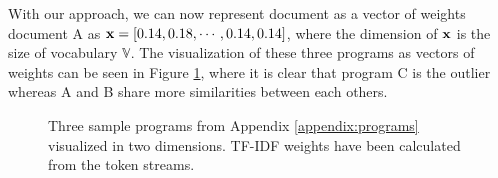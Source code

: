 With our approach, we can now represent document as a vector of weights \eg document A as $\mathbf{x} = [0.14, 0.18, \cdots, 0.14, 0.14]$, where the dimension of $\mathbf{x}$ is the size of vocabulary $\mathbb{V}$. The visualization of these three programs as vectors of weights can be seen in Figure \ref{fig-tfidf}, where it is clear that program C is the outlier whereas A and B share more similarities between each others.

\begin{figure}[ht]
\centering
\setlength\figureheight{7cm}
\setlength\figurewidth{10cm}


\caption{Three sample programs from Appendix \ref{appendix:programs} visualized in two dimensions. TF-IDF weights have been calculated from the token streams.} \label{fig-tfidf}
\end{figure}








